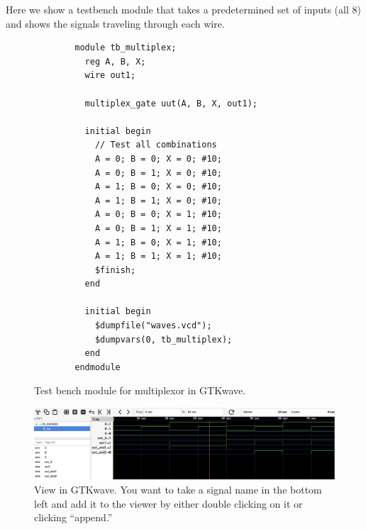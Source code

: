   \begin{example}
    Here we show a testbench module that takes a predetermined set of inputs (all 8) and shows the signals traveling through each wire. 

    \begin{figure}[H]
      \centering 
      \begin{lstlisting}
        module tb_multiplex;
          reg A, B, X;
          wire out1;

          multiplex_gate uut(A, B, X, out1);

          initial begin
            // Test all combinations
            A = 0; B = 0; X = 0; #10;
            A = 0; B = 1; X = 0; #10;
            A = 1; B = 0; X = 0; #10;
            A = 1; B = 1; X = 0; #10;
            A = 0; B = 0; X = 1; #10;
            A = 0; B = 1; X = 1; #10;
            A = 1; B = 0; X = 1; #10;
            A = 1; B = 1; X = 1; #10;
            $finish;
          end

          initial begin
            $dumpfile("waves.vcd");
            $dumpvars(0, tb_multiplex);
          end
        endmodule
      \end{lstlisting}
      \caption{Test bench module for multiplexor in GTKwave.} 
    \end{figure}

    \begin{figure}[H]
      \centering 
      \includegraphics[scale=0.3]{img/multiplexor_gtk.png}
      \caption{View in GTKwave. You want to take a signal name in the bottom left and add it to the viewer by either double clicking on it or clicking ``append.''}
    \end{figure}
  \end{example}


